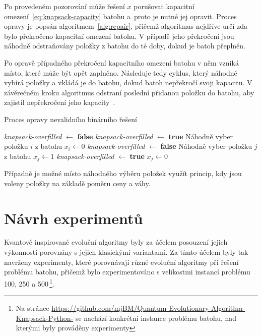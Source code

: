 Po provedeném pozorování může řešení $x$ porušovat kapacitní omezení~\ref{eq:knapsack-capacity} batohu a~proto je nutné jej opravit. 
Proces opravy je popsán algoritmem~\ref{alg:repair}, přičemž algoritmus nejdříve určí zda bylo překročeno kapacitní omezení batohu. 
V případě jeho překročení jsou náhodně odstraňovány položky z batohu do té doby, dokud je batoh přeplněn. 

Po opravě případného překročení kapacitního omezení batohu v něm vzniká místo, které může být opět zaplněno. 
Následuje tedy cyklus, který náhodně vybírá položky a vkládá je do batohu, dokud batoh nepřekročí svoji kapacitu. 
V závěrečném kroku algoritmus odstraní poslední přidanou položku do batohu, aby zajistil nepřekročení jeho kapacity~\cite{qiga}.
\begin{algorithm}[ht!]
    \caption{Proces opravy nevalidního binárního řešení}
    \label{alg:repair}
    \begin{algorithmic}[1]
        \State \textit{knapsack-overfilled} $\gets$ \textbf{false}
            \State \textit{knapsack-overfilled} $\gets$ \textbf{true}
        \EndIf
            \State Náhodně vyber položku $i$ z batohu
            \State $x_i \gets 0$
                \State \textit{knapsack-overfilled} $\gets$ \textbf{false}
            \EndIf
        \EndWhile
            \State Náhodně vyber položku $j$ z batohu
            \State $x_j \gets 1$
                \State \textit{knapsack-overfilled} $\gets$ \textbf{true}
            \EndIf
        \EndWhile
        \State $x_j \gets 0$
    \end{algorithmic}
\end{algorithm}
Případně je možné místo náhodného výběru položek využít princip, kdy jsou voleny položky na základě poměru ceny a váhy. 

\section{Návrh experimentů}\label{sec:experiments-design}
Kvantově inspirované evoluční algoritmy byly za účelem posouzení jejich výkonnosti porovnány s jejich klasickými variantami. 
Za tímto účelem byly tak navrženy experimenty, které porovnávají různé evoluční algoritmy při řešení problému batohu, přičemž bylo experimentováno s velikostmi instancí problému 100, 250 a 500\,\footnote{Na stránce \url{https://github.com/mjBM/Quantum-Evolutionary-Algorithm-Knapsack-Python-} se nachází konkrétní instance problému batohu, nad kterými byly prováděny experimenty}. 

